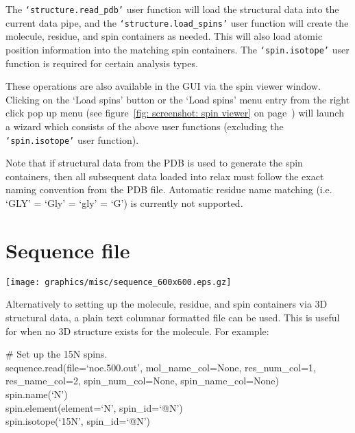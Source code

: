 The \texttt{`structure.read\_pdb'} user function will load the structural data into the current data pipe, and the \texttt{`structure.load\_spins'} user function will create the molecule, residue, and spin containers as needed.  This will also load atomic position information into the matching spin containers.  The \texttt{`spin.isotope'} user function is required for certain analysis types.

These operations are also available in the GUI via the spin viewer window.  Clicking on the `Load spins' button or the `Load spins' menu entry from the right click pop up menu (see figure~\ref{fig: screenshot: spin viewer} on page~\pageref{fig: screenshot: spin viewer}) will launch a wizard which consists of the above user functions (excluding the \texttt{`spin.isotope'} user function).

Note that if structural data from the PDB is used to generate the spin containers, then all subsequent data loaded into relax must follow the exact naming convention from the PDB file.  Automatic residue name matching (i.e. `GLY' = `Gly' = `gly' = `G') is currently not supported.




\section{Sequence file}

\begin{figure*}[h]
\texttt{[image: graphics/misc/sequence\_600x600.eps.gz]}
\end{figure*}

Alternatively to setting up the molecule, residue, and spin containers via 3D structural data, a plain text columnar formatted file can be used.  This is useful for when no 3D structure exists for the molecule.  For example:

\begin{exampleenv}
\# Set up the 15N spins. \\
sequence.read(file=`noe.500.out', mol\_name\_col=None, res\_num\_col=1, res\_name\_col=2, spin\_num\_col=None, spin\_name\_col=None) \\
spin.name(`N') \\
spin.element(element=`N', spin\_id=`@N') \\
spin.isotope(`15N', spin\_id=`@N')
\end{exampleenv}

